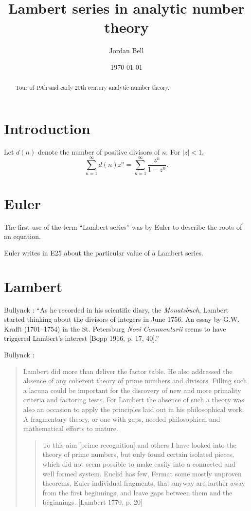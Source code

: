 \documentclass{amsart}
\begin{document}
\title{Lambert series in analytic number theory}
\author{Jordan Bell}
\address{Department of Mathematics, University of Toronto, Toronto, Ontario, Canada}
\date{\today}


\begin{abstract}
Tour of 19th and early 20th century analytic number theory.
\end{abstract}

\maketitle



\section{Introduction}
Let $d(n)$ denote the number of positive divisors of $n$. 
For $|z|<1$,
\[
\sum_{n=1}^\infty d(n) z^n = \sum_{n=1}^\infty \frac{z^n}{1-z^n}.
\]


\section{Euler}
The first use of the term ``Lambert series'' was by Euler to describe the roots of an equation.
 
Euler writes in E25 \cite{E25} about the particular value of a Lambert series.



\section{Lambert}
Bullynck \cite[pp.~157--158]{bullynck}: ``As he recorded in his scientific diary,
the {\em Monatsbuch}, Lambert started
thinking about the divisors of integers in June 1756. An essay by G.W.
Krafft (1701–1754) in the St. Petersburg {\em Novi Commentarii} seems to have
triggered Lambert's interest [Bopp 1916, p. 17, 40].''

Bullynck \cite[p.~163]{bullynck}:

\begin{quote}
Lambert did more than deliver the factor table. He also addressed the
	absence of any coherent theory of prime numbers and divisors. Filling
	such a lacuna could be important for the discovery of new and more primality criteria and
	factoring tests. For Lambert the absence of such a theory was also an occasion to apply the principles
	laid
	out in his philosophical
	work. A fragmentary theory, or one with gaps, needed philosophical and
	mathematical efforts to mature.
	
	\begin{quote}
		To this aim [prime recognition] and others I have looked into the theory
		of prime numbers, but only found certain isolated pieces, which did not seem
		possible to make easily into a connected and well formed system. Euclid has
		few, Fermat some mostly unproven theorems, Euler individual fragments, that
		anyway are farther away from the first beginnings, and leave gaps between them
		and the beginnings. [Lambert 1770, p. 20]
		\end{quote}
\end{quote}
\end{document}

